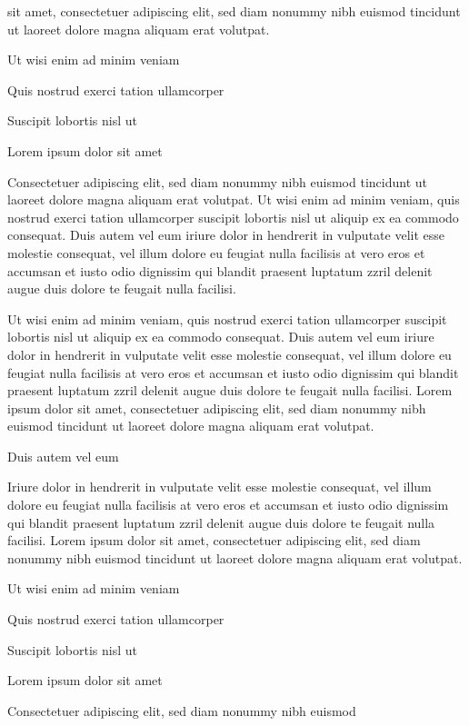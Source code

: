 \documentclass[11pt,twoside]{article}\makeatletter
\begin{document}
      sit amet, consectetuer adipiscing elit, sed diam nonummy nibh euismod
      tincidunt ut laoreet dolore magna aliquam erat volutpat. \par Ut wisi enim ad minim veniam\par Quis nostrud exerci tation ullamcorper \par Suscipit lobortis nisl ut \par Lorem ipsum dolor sit amet\par Consectetuer adipiscing elit, sed diam nonummy nibh euismod
      tincidunt ut laoreet dolore magna aliquam erat volutpat. Ut wisi enim
      ad minim veniam, quis nostrud exerci tation ullamcorper suscipit
      lobortis nisl ut aliquip ex ea commodo consequat. Duis autem vel eum
      iriure dolor in hendrerit in vulputate velit esse molestie consequat,
      vel illum dolore eu feugiat nulla facilisis at vero eros et accumsan
      et iusto odio dignissim qui blandit praesent luptatum zzril delenit
      augue duis dolore te feugait nulla facilisi.\par Ut wisi enim ad minim veniam, quis nostrud exerci tation
      ullamcorper suscipit lobortis nisl ut aliquip ex ea commodo
      consequat. Duis autem vel eum iriure dolor in hendrerit in vulputate
      velit esse molestie consequat, vel illum dolore eu feugiat nulla
      facilisis at vero eros et accumsan et iusto odio dignissim qui blandit
      praesent luptatum zzril delenit augue duis dolore te feugait nulla
      facilisi. Lorem ipsum dolor sit amet, consectetuer adipiscing elit,
      sed diam nonummy nibh euismod tincidunt ut laoreet dolore magna
      aliquam erat volutpat. \par Duis autem vel eum \par Iriure dolor in hendrerit in vulputate velit esse molestie
      consequat, vel illum dolore eu feugiat nulla facilisis at vero eros et
      accumsan et iusto odio dignissim qui blandit praesent luptatum zzril
      delenit augue duis dolore te feugait nulla facilisi. Lorem ipsum dolor
      sit amet, consectetuer adipiscing elit, sed diam nonummy nibh euismod
      tincidunt ut laoreet dolore magna aliquam erat volutpat. \par Ut wisi enim ad minim veniam\par Quis nostrud exerci tation ullamcorper \par Suscipit lobortis nisl ut \par Lorem ipsum dolor sit amet\par Consectetuer adipiscing elit, sed diam nonummy nibh euismod
\end{document}
